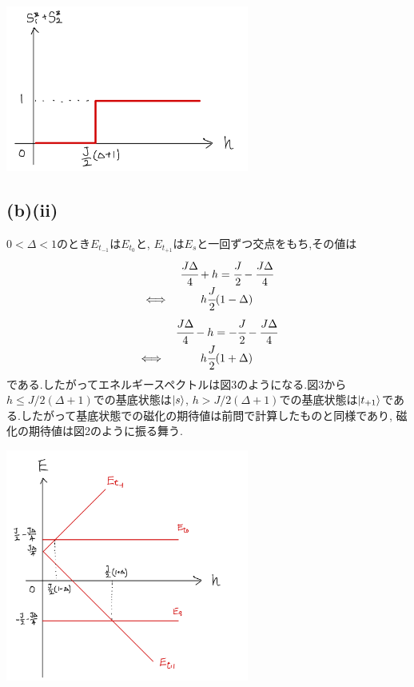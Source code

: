 \documentclass[uplatex,a4j,11pt,dvipdfmx]{jsarticle}
\makeatletter
\def\fgcaption{\def\@captype{figure}\caption}
\def\fgcaption{\def\@captype{figure}\caption}
\makeatother
\begin{document}
\begin{center}
  \includegraphics[width=8cm]{mspec_dgeq0.png}
  \fgcaption{$\Delta\geq1$の場合の磁化の期待値}
\end{center}
\subsection*{(b)(ii)}
$0<\Delta<1$のとき$E_{t_{-1}}$は$E_{t_0}$と, $E_{t_{+1}}$は$E_s$と一回ずつ交点をもち,その値は
\begin{align}
  \begin{array}{cc}
    &\cfrac{J\Delta}{4}+h=\cfrac{J}{2}-\cfrac{J\Delta}{4}\\
    \iff&h\cfrac{J}{2}(1-\Delta)
  \end{array}
\end{align}
\begin{align}
  \begin{array}{cc}
    &\cfrac{J\Delta}{4}-h=-\cfrac{J}{2}-\cfrac{J\Delta}{4}\\
    \iff&h\cfrac{J}{2}(1+\Delta)
  \end{array}
\end{align}
である.したがってエネルギースペクトルは図3のようになる.図3から$h\leq J/2(\Delta+1)$での基底状態は$\Ket{s}$,
$h>J/2(\Delta+1)$での基底状態は$\Ket{t_{+1}}$である.したがって基底状態での磁化の期待値は前問で計算したものと同様であり,
磁化の期待値は図2のように振る舞う.
\begin{center}
  \includegraphics[width=8cm]{espec_dleq1.png}
  \fgcaption{$\Delta<1$の場合のエネルギースペクトル}
\end{center}
\end{document}
